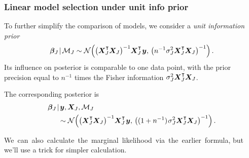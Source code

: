 \documentclass[18pt]{beamer}
\newcommand{\defineTightSpacing}{%
	\setlength{\abovedisplayskip}{.25\baselineskip}%
	\setlength{\belowdisplayskip}{.25\baselineskip}%
}
\newcommand{\given}{\mskip.7\thinmuskip | \mskip.7\thinmuskip}
\newcommand{\transpose}{\text{\raisebox{.5ex}{$\intercal$}}}
\newcommand{\thinnerspace}{\mskip.5\thinmuskip}
\newcommand{\normalDist}{\operatorname{\mathcal{N}}}
\newcommand{\by}{\bm{y}}
\newcommand{\bX}{\bm{X}}
\newcommand{\bbeta}{\bm{\beta}}
\newcommand{\model}{\mathcal{M}}
\newcommand{\nonzeroCoefSet}{J}
\begin{document}
\begin{frame}
\frametitle{Linear model selection under unit info prior}
To further simplify the comparison of models, we consider a \textit{unit information prior}
\begin{equation*} \defineTightSpacing%
\bbeta_\nonzeroCoefSet \given \model_\nonzeroCoefSet 
\sim \normalDist\!\left(
	\left( \bX_\nonzeroCoefSet^\transpose \bX_\nonzeroCoefSet \right)^{-1} \! \bX_\nonzeroCoefSet^\transpose \thinnerspace \by, \,
	\left( n^{-1} \sigma_\nonzeroCoefSet^2 \bX_\nonzeroCoefSet^\transpose \bX_\nonzeroCoefSet \right)^{-1}
\right).
\end{equation*}
\pause
Its influence on posterior is comparable to one data point, with the prior precision equal to $n^{-1}$ times the Fisher information $\sigma_\nonzeroCoefSet^2 \bX_\nonzeroCoefSet^\transpose \bX_\nonzeroCoefSet$.

\pause
\smallskip
The corresponding posterior is 
\begin{equation*} \defineTightSpacing%
\begin{aligned}
&\bbeta_\nonzeroCoefSet \given \by, \bX_\nonzeroCoefSet, \model_\nonzeroCoefSet \\
&\hspace*{1.5em}\sim \normalDist\!\left(
	\left( \bX_\nonzeroCoefSet^\transpose \bX_\nonzeroCoefSet \right)^{-1} \! \bX_\nonzeroCoefSet^\transpose \thinnerspace \by, \,
	\left( (1 + n^{-1}) \thinnerspace \sigma_\nonzeroCoefSet^2 \bX_\nonzeroCoefSet^\transpose \bX_\nonzeroCoefSet \right)^{-1}
\right).
\end{aligned}
\end{equation*}

\pause
\smallskip
\mbox{We can also calculate the marginal likelihood via the earlier formula,} but we'll use a trick for simpler calculation.
\end{frame}
\end{document}
